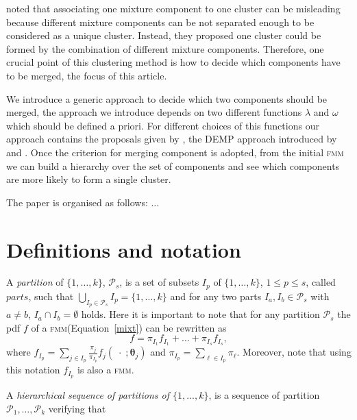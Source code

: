 \documentclass[10pt, a4paper]{article}
\newcommand{\m}[1]{\boldsymbol{#1}}
\newcommand{\fmm}{\textsc{fmm}\xspace}
\begin{document}
\begin{spacing}{1.9}
\cite{lee2004combining,hennig2010methods,baudry2010combining,melnykov2013distribution,pastore2013merging} noted that associating one mixture component to one cluster can be misleading because different mixture components can be not separated enough to be considered as a unique cluster. Instead, they proposed one cluster could be formed by the combination of different mixture components. Therefore, one crucial point of this clustering method is how to decide which components have to be merged, the focus of this article.


We introduce a generic approach to decide which two components should be merged, the approach we introduce depends on two different functions $\lambda$ and $\omega$ which should be defined a priori. For different choices of this functions our approach contains the proposals given by \cite{baudry2010combining}, the DEMP approach introduced by \cite{hennig2010methods} and \cite{longford2014}. Once the criterion for merging component is adopted, from the initial \fmm we can build a hierarchy over the set of components and see which components are more likely to form a single cluster.

The paper is organised as follows: $\dots$


\section{Definitions and notation}

%
A \emph{partition} of $\{1, \dots, k\}$, $\mathcal{P}_s$,  is a set of subsets $I_p$ of $\{1, \dots, k\}$, $1\leq p \leq s$, called $parts$, such that $\bigcup_{I_p \in \mathcal{P}_s} I_p = \{1, \dots, k\}$ and for any two parts $I_a, I_b \in \mathcal{P}_s$ with $a \neq b$, $I_a \cap I_b = \emptyset$ holds. Here it is important to note that for any partition  $\mathcal{P}_s$ the pdf $f$ of a \fmm (Equation~\ref{mixt}) can be rewritten as
\begin{equation}
f = \pi_{I_1} f_{I_1} + \dots + \pi_{I_s} f_{I_s},
\label{mixt_part}
\end{equation}
where $f_{I_p} = \sum_{j \in I_p} \frac{\pi_j}{\pi_{I_p}} f_j(\;\cdot\; ; \m\theta_j)$ and $\pi_{I_p} = \sum_{\ell \in I_p} \pi_\ell$. Moreover, note that using this notation $f_{I_p}$ is also a \fmm.



A \emph{hierarchical sequence of partitions of $\{1,...,k\}$}, is a sequence of partition $\mathcal{P}_1, \dots, \mathcal{P}_k$ verifying that
  

\end{spacing}
\end{document}
